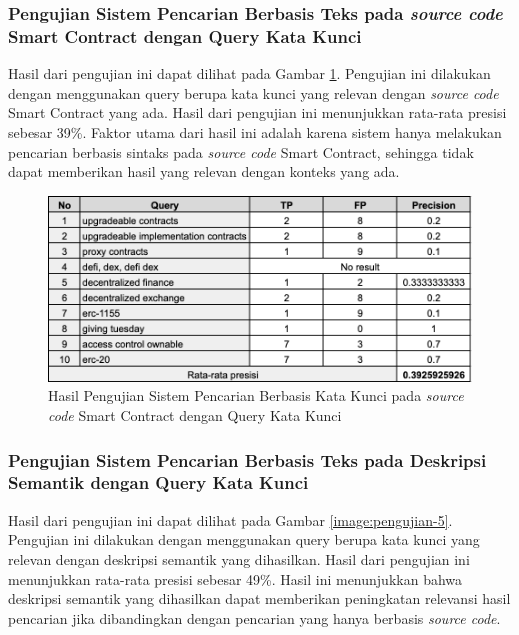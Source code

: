 \subsubsection{Pengujian Sistem Pencarian Berbasis Teks pada \textit{source code} Smart Contract dengan Query Kata Kunci}

Hasil dari pengujian ini dapat dilihat pada Gambar \ref{image:pengujian-4}. Pengujian ini dilakukan dengan menggunakan query berupa kata kunci yang relevan dengan \textit{source code} Smart Contract yang ada. Hasil dari pengujian ini menunjukkan rata-rata presisi sebesar 39\%. Faktor utama dari hasil ini adalah karena sistem hanya melakukan pencarian berbasis sintaks pada \textit{source code} Smart Contract, sehingga tidak dapat memberikan hasil yang relevan dengan konteks yang ada.

\begin{figure}[ht]
	\centering
	\includegraphics[width=1\textwidth]{resources/chapter-4/data-1-4.png}
	\caption{Hasil Pengujian Sistem Pencarian Berbasis Kata Kunci pada \textit{source code} Smart Contract dengan Query Kata Kunci}
	\label{image:pengujian-4}
\end{figure}

\subsubsection{Pengujian Sistem Pencarian Berbasis Teks pada Deskripsi Semantik dengan Query Kata Kunci}

Hasil dari pengujian ini dapat dilihat pada Gambar \ref{image:pengujian-5}. Pengujian ini dilakukan dengan menggunakan query berupa kata kunci yang relevan dengan deskripsi semantik yang dihasilkan. Hasil dari pengujian ini menunjukkan rata-rata presisi sebesar 49\%. Hasil ini menunjukkan bahwa deskripsi semantik yang dihasilkan dapat memberikan peningkatan relevansi hasil pencarian jika dibandingkan dengan pencarian yang hanya berbasis \textit{source code}.

